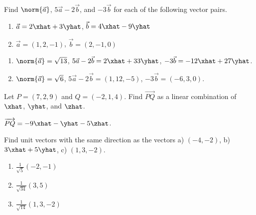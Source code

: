 \begin{exercises}
	\begin{problist}
        \prob  Find $\norm{\vec{a}}$, $5\vec a-2\vec b$, and $-3\vec b$ for each of the following
			vector pairs.
			\begin{enumerate}
				\item   $\vec a=2\xhat+3\yhat$, $\vec b=4\xhat-9\yhat$
				\item   $\vec a=(1,2,-1)$, $\vec b=(2,-1,0)$
			\end{enumerate}
            \begin{solution}
                \begin{enumerate}
                    \item   $\norm{\vec{a}} = \sqrt{13}$, $5\vec{a} - 2\vec{b} = 2\xhat + 33\yhat$,
                        $-3\vec{b} = -12\xhat + 27\yhat$.
                    \item   $\norm{\vec{a}} = \sqrt{6}$, $5\vec{a} - 2\vec{b} = (1, 12, -5)$, $-3\vec{b}
                        = (-6, 3, 0)$.
                \end{enumerate}
            \end{solution}

		\prob  Let $P=(7,2,9)$ and $Q=(-2,1,4)$.  Find $\overrightarrow{PQ}$ as a linear
			combination of $\xhat$, $\yhat$, and $\zhat$.
            \begin{solution}
                $\overrightarrow{PQ} = -9\xhat -\yhat - 5\zhat$.
            \end{solution}

		\prob  Find unit vectors with the same direction as the vectors a) $(-4, -2)$,
			b) $3\xhat + 5\yhat$, c) $(1, 3, -2)$.
            \begin{solution}
                \begin{enumerate}
                    \item   $\frac{1}{\sqrt{5}}(-2, -1)$
                    \item   $\frac{1}{\sqrt{34}}(3, 5)$
                    \item   $\frac{1}{\sqrt{14}}(1, 3, -2)$
                \end{enumerate}
            \end{solution}


\end{problist}
\end{exercises}
